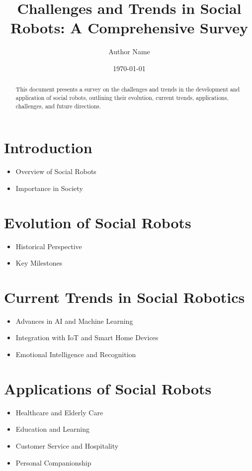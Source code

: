 \documentclass{article}
\title{Challenges and Trends in Social Robots: A Comprehensive Survey}
\author{Author Name}
\date{\today}
\begin{document}
\maketitle

\begin{abstract}
This document presents a survey on the challenges and trends in the development and application of social robots, outlining their evolution, current trends, applications, challenges, and future directions.
\end{abstract}

\section{Introduction}
\begin{itemize}
    \item Overview of Social Robots
    \item Importance in Society
\end{itemize}

\section{Evolution of Social Robots}
\begin{itemize}
    \item Historical Perspective
    \item Key Milestones
\end{itemize}

\section{Current Trends in Social Robotics}
\begin{itemize}
    \item Advances in AI and Machine Learning
    \item Integration with IoT and Smart Home Devices
    \item Emotional Intelligence and Recognition
\end{itemize}

\section{Applications of Social Robots}
\begin{itemize}
    \item Healthcare and Elderly Care
    \item Education and Learning
    \item Customer Service and Hospitality
    \item Personal Companionship
\end{itemize}
\end{document}
